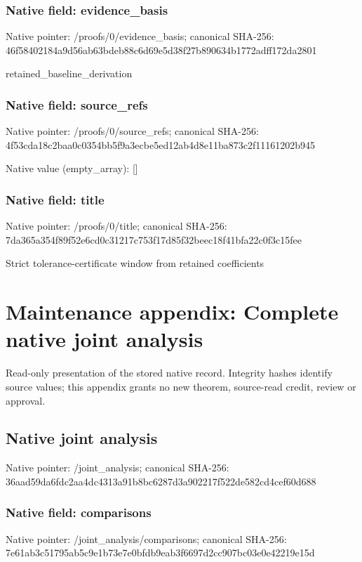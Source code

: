\documentclass[10pt,a4paper]{article}
\begin{document}
\subsubsection{Native field: evidence\_\allowbreak{}basis}
Native pointer: /proofs/0/evidence\_\allowbreak{}basis; canonical SHA-256: 46f58402184a9d56ab63bdeb88c6d69e5d38f27b890634b1772adff172da2801

\begingroup\raggedright\sloppy retained\_\allowbreak{}baseline\_\allowbreak{}derivation\par\endgroup

\subsubsection{Native field: source\_\allowbreak{}refs}
Native pointer: /proofs/0/source\_\allowbreak{}refs; canonical SHA-256: 4f53cda18c2baa0c0354bb5f9a3ecbe5ed12ab4d8e11ba873c2f11161202b945

Native value (empty\_\allowbreak{}array): []

\subsubsection{Native field: title}
Native pointer: /proofs/0/title; canonical SHA-256: 7da365a354f89f52e6cd0c31217c753f17d85f32beec18f41bfa22c0f3c15fee

\begingroup\raggedright\sloppy Strict tolerance-certificate window from retained coefficients\par\endgroup

\section{Maintenance appendix: Complete native joint analysis}
Read-only presentation of the stored native record. Integrity hashes identify source values; this appendix grants no new theorem, source-read credit, review or approval.

\subsection{Native joint analysis}
Native pointer: /joint\_\allowbreak{}analysis; canonical SHA-256: 36aad59da6fdc2aa4dc4313a91b8bc6287d3a902217f522de582cd4cef60d688

\subsubsection{Native field: comparisons}
Native pointer: /joint\_\allowbreak{}analysis/comparisons; canonical SHA-256: 7e61ab3c51795ab5c9e1b73e7e0bfdb9eab3f6697d2cc907bc03e0e42219e15d
\end{document}
